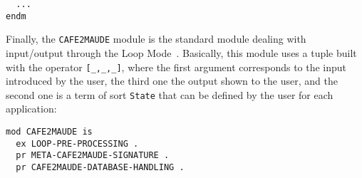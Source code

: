 {\begin{comment}
  op normOpenCloseAux : QidList -> QidList .
  ceq normOpenCloseAux(QIL Q Q' QIL') = normOpenCloseAux(QIL Q '. Q' QIL')
   if Q =/= '. /\ Q =/= '`, /\ Q =/= '`] /\ Q =/= '* /\ Q =/= '`) /\
     (Q' == 'eq or-else Q' == 'ceq or-else Q' == 'cq or-else
      Q' == 'op or-else Q' == 'ops or-else Q' == 'bop or-else
      Q' == 'bops or-else Q' == 'var or-else
      Q' == 'vars or-else Q' == 'beq or-else Q' == 'bceq or-else
      Q' == 'bcq or-else Q' == 'trans or-else Q' == 'btrans or-else
      Q' == 'ctrans or-else Q' == 'bctrans or-else Q' == 'trns or-else
      Q' == 'ctrns or-else Q' == 'btrns or-else Q' == 'bctrns or-else
      Q' == 'pred or-else Q' == 'red or-else Q' == 'reduction) .
  eq normOpenCloseAux(QIL Q 'close) = if Q =/= '. and Q =/= '`] and
                                         Q =/= '* and Q =/= '`)
                                      then QIL Q '. 'close
                                      else QIL Q 'close
                                      fi [owise] .

  eq ['mod! QIL '`}, S, QIL'] = [normalizeCafeOBJ('cmod! QIL '`}), S, QIL'] .
  eq ['module! QIL '`}, S, QIL'] = ['mod! QIL '`}, S, QIL'] .
  eq ['mod* QIL '`}, S, QIL'] = [normalizeCafeOBJ('cmod* QIL '`}), S, QIL'] .
  eq ['module* QIL '`}, S, QIL'] = ['mod* QIL '`}, S, QIL'] .
  eq ['open QIL 'close, S, QIL'] = ['copen normalizeOpenClose(QIL 'close), S, QIL'] .
  eq ['view QIL '`}, S, QIL'] = [normalizeCafeOBJView('cview QIL '. '`}), S, QIL'] .
  eq ['make Q QIL, S, QIL'] = ['mod! Q '`{ 'pr QIL '`}, S, QIL'] .
  ceq [QIL 'eq '`[ Q '`] Q' QIL', S, QIL''] = [QIL 'eq '`[ Q '`] ': Q' QIL', S, QIL'']
   if Q' =/= ': .
\end{comment}
}
{\codesize
\begin{verbatim}
  ...
endm
\end{verbatim}
}

Finally, the \verb"CAFE2MAUDE" module is the standard module dealing with input/output
through the Loop Mode~\cite[Chapter~17]{maude-book}. Basically, this module uses a tuple
built with the operator \verb"[_,_,_]", where the first argument corresponds to the
input introduced by the user, the third one the output shown to the user, and the second
one is a term of sort \verb"State" that can be defined by the user for each application:

{\codesize
\begin{verbatim}
mod CAFE2MAUDE is
  ex LOOP-PRE-PROCESSING .
  pr META-CAFE2MAUDE-SIGNATURE .
  pr CAFE2MAUDE-DATABASE-HANDLING .
\end{verbatim}
}

